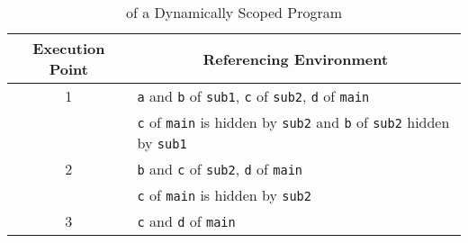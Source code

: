 \begin{table}[h!]
  \centering
  \begin{tabular}{cl}
    \toprule
    Execution Point & \multicolumn{1}{c}{Referencing Environment} \\
    \midrule
    1 & \texttt{a} and \texttt{b} of \texttt{sub1}, \texttt{c} of \texttt{sub2}, \texttt{d} of \texttt{main} \\
                    & \texttt{c} of \texttt{main} is hidden by \texttt{sub2} and \texttt{b} of \texttt{sub2} hidden by \texttt{sub1} \\
    2 & \texttt{b} and \texttt{c} of \texttt{sub2}, \texttt{d} of \texttt{main} \\
                    & \texttt{c} of \texttt{main} is hidden by \texttt{sub2} \\
    3 & \texttt{c} and \texttt{d} of \texttt{main} \\
    \bottomrule
  \end{tabular}
  \caption{ of a Dynamically Scoped Program}
  \label{tab:Dynamic_Scope_Referencing_Environment-Execution}
\end{table}

